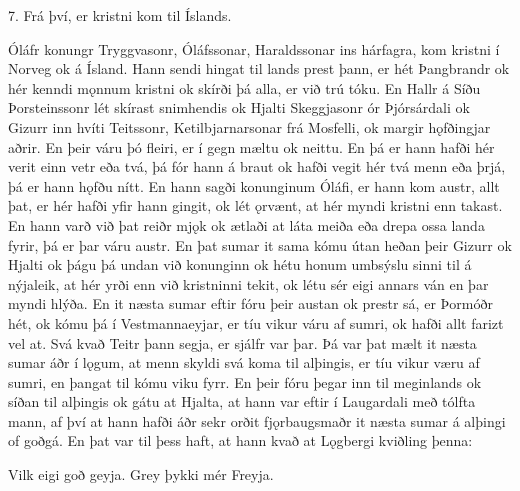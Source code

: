 7. Frá því, er kristni kom til Íslands.

Óláfr konungr Tryggvasonr, Óláfssonar, Haraldssonar ins hárfagra, kom kristni í Norveg ok á Ísland.
Hann sendi hingat til lands prest þann, er hét Þangbrandr ok hér kenndi mǫnnum kristni ok skírði þá alla, er við trú tóku. En Hallr á Síðu Þorsteinssonr lét skírast snimhendis ok Hjalti Skeggjasonr ór Þjórsárdali ok Gizurr inn hvíti Teitssonr, Ketilbjarnarsonar frá Mosfelli, ok margir hǫfðingjar aðrir. En þeir váru þó fleiri, er í gegn mæltu ok neittu. En þá er hann hafði hér verit einn vetr eða tvá, þá fór hann á braut ok hafði vegit hér tvá menn eða þrjá, þá er hann hǫfðu nítt. En hann sagði konunginum Óláfi, er hann kom austr, allt þat, er hér hafði yfir hann gingit, ok lét ǫrvænt, at hér myndi kristni enn takast. En hann varð við þat reiðr mjǫk ok ætlaði at láta meiða eða drepa ossa landa fyrir, þá er þar váru austr.
En þat sumar it sama kómu útan heðan þeir Gizurr ok Hjalti ok þágu þá undan við konunginn ok hétu honum umbsýslu sinni til á nýjaleik, at hér yrði enn við kristninni tekit, ok létu sér eigi annars ván en þar myndi hlýða.
En it næsta sumar eftir fóru þeir austan ok prestr sá, er Þormóðr hét, ok kómu þá í Vestmannaeyjar, er tíu vikur váru af sumri, ok hafði allt farizt vel at. Svá kvað Teitr þann segja, er sjálfr var þar.
Þá var þat mælt it næsta sumar áðr í lǫgum, at menn skyldi svá koma til alþingis, er tíu vikur væru af sumri, en þangat til kómu viku fyrr.
En þeir fóru þegar inn til meginlands ok síðan til alþingis ok gátu at Hjalta, at hann var eftir í Laugardali með tólfta mann, af því at hann hafði áðr sekr orðit fjǫrbaugsmaðr it næsta sumar á alþingi of goðgá. En þat var til þess haft, at hann kvað at Lǫgbergi kviðling þenna:

Vilk eigi goð geyja.
Grey þykki mér Freyja.

